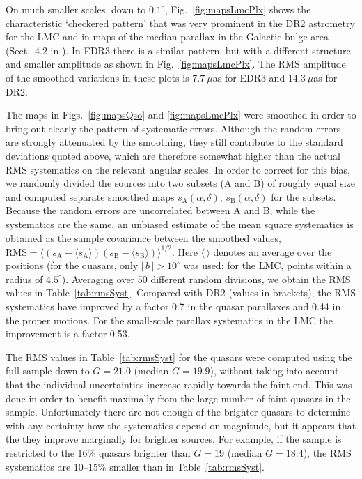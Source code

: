 \documentclass[longauth]{aa} %
\begin{document}
On much smaller scales, down to $0.1^\circ$, Fig.~\ref{fig:mapsLmcPlx} shows the 
characteristic `checkered pattern' that was very prominent in the DR2 astrometry
for the LMC and in maps of the median parallax in the Galactic bulge 
area (Sect.~4.2 in ). In EDR3 there is a similar pattern,
but with a different structure and smaller amplitude as shown in Fig.~\ref{fig:mapsLmcPlx}.
The RMS amplitude of the smoothed variations in these plots is $7.7~\mu$as for EDR3 
and $14.3~\mu$as for DR2. 

The maps in Figs.~\ref{fig:mapsQso} and \ref{fig:mapsLmcPlx} were smoothed in order to
bring out clearly the pattern of systematic errors. Although the random errors are strongly
attenuated by the smoothing, they still contribute to the standard deviations quoted above,
which are therefore somewhat higher than the actual RMS systematics on the relevant 
angular scales. In order to correct for this bias, we randomly divided the sources into 
two subsets (A and B) of roughly equal size and computed separate smoothed maps 
$s_\text{A}(\alpha,\delta)$, $s_\text{B}(\alpha,\delta)$ for the subsets. 
Because the random errors are uncorrelated between A and B, while the systematics 
are the same, an unbiased estimate of the mean square systematics is obtained as
the sample covariance between the smoothed values, 
$\text{RMS}=\langle(s_\text{A}-\langle s_\text{A}\rangle)(s_\text{B}
-\langle s_\text{B}\rangle)\rangle^{1/2}$. 
Here $\langle\,\rangle$ denotes an average over the positions (for the quasars,
only $|\,b\,|>10^\circ$ was used; for the LMC, points within a radius of $4.5^\circ$).
Averaging over 50 different random divisions, we obtain the RMS values in 
Table~\ref{tab:rmsSyst}. Compared with DR2 (values in brackets), the RMS
systematics have improved by a factor 0.7 in the quasar parallaxes and 0.44 in the proper 
motions. For the small-scale parallax systematics in the LMC the improvement is a factor 0.53.

The RMS values in Table~\ref{tab:rmsSyst} for the quasars were computed using the full sample 
down to $G=21.0$ (median $G=19.9$), without taking into account that the individual 
uncertainties increase rapidly towards the faint end. This was done in order to benefit maximally 
from the large number of faint quasars in the sample. Unfortunately there are not enough 
of the brighter quasars to determine with any certainty how the systematics depend on 
magnitude, but it appears that the they improve marginally for brighter sources. For example, 
if the sample is restricted to the 16\% quasars brighter than $G=19$ (median $G=18.4$), the 
RMS systematics are 10--15\% smaller than in Table~\ref{tab:rmsSyst}.
\end{document}
